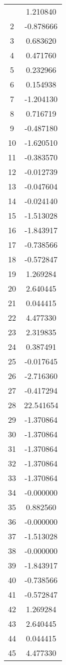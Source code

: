 \documentclass[12pt]{article}
\begin{document}
\begin{longtable}{@{}cc@{}}
\bottomrule
\endlastfoot
1 & 1.210840 \\
2 & -0.878666 \\
3 & 0.683620 \\
4 & 0.471760 \\
5 & 0.232966 \\
6 & 0.154938 \\
7 & -1.204130 \\
8 & 0.716719 \\
9 & -0.487180 \\
10 & -1.620510 \\
11 & -0.383570 \\
12 & -0.012739 \\
13 & -0.047604 \\
14 & -0.024140 \\
15 & -1.513028 \\
16 & -1.843917 \\
17 & -0.738566 \\
18 & -0.572847 \\
19 & 1.269284 \\
20 & 2.640445 \\
21 & 0.044415 \\
22 & 4.477330 \\
23 & 2.319835 \\
24 & 0.387491 \\
25 & -0.017645 \\
26 & -2.716360 \\
27 & -0.417294 \\
28 & 22.541654 \\
29 & -1.370864 \\
30 & -1.370864 \\
31 & -1.370864 \\
32 & -1.370864 \\
33 & -1.370864 \\
34 & -0.000000 \\
35 & 0.882560 \\
36 & -0.000000 \\
37 & -1.513028 \\
38 & -0.000000 \\
39 & -1.843917 \\
40 & -0.738566 \\
41 & -0.572847 \\
42 & 1.269284 \\
43 & 2.640445 \\
44 & 0.044415 \\
45 & 4.477330 \\

\end{longtable}
\end{document}
